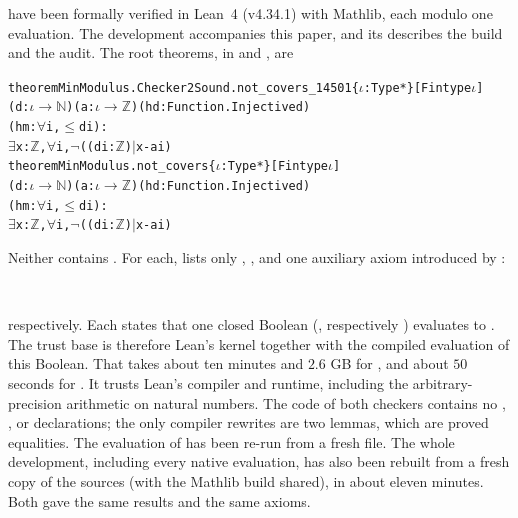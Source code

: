  have been formally verified in Lean~4 (v4.34.1) with Mathlib, each modulo one
 evaluation. The development accompanies this paper, and its  describes the build and the audit. The root
theorems, in  and , are
\begin{alltt}\small
theorem MinModulus.Checker2Sound.not_covers_14501 \{\(\iota\) : Type*\} [Fintype \(\iota\)]
    (d : \(\iota\) \(\to\) \(\mathbb{N}\)) (a : \(\iota\) \(\to\) \(\mathbb{Z}\)) (hd : Function.Injective d)
    (hm : \(\forall\) i, \MzeroNum \(\le\) d i) :
    \(\exists\) x : \(\mathbb{Z}\), \(\forall\) i, \(\neg\) ((d i : \(\mathbb{Z}\)) \(\mid\) x - a i)
theorem MinModulus.not_covers \{\(\iota\) : Type*\} [Fintype \(\iota\)]
    (d : \(\iota\) \(\to\) \(\mathbb{N}\)) (a : \(\iota\) \(\to\) \(\mathbb{Z}\)) (hd : Function.Injective d)
    (hm : \(\forall\) i, \MzeroLeanNum \(\le\) d i) :
    \(\exists\) x : \(\mathbb{Z}\), \(\forall\) i, \(\neg\) ((d i : \(\mathbb{Z}\)) \(\mid\) x - a i)
\end{alltt}
Neither contains . For each,  lists only , ,
 and one auxiliary axiom introduced by :
\begin{center}\small{}\\
\end{center}
respectively. Each states that one closed Boolean (, respectively ) evaluates to
. The trust base is therefore Lean's kernel together with the compiled evaluation of this Boolean. That
takes about ten minutes and $2.6$ GB for , and about $50$ seconds for . It trusts
Lean's compiler and runtime, including the arbitrary-precision arithmetic on natural numbers. The code of both
checkers contains no , ,  or  declarations; the only
compiler rewrites are two  lemmas, which are proved equalities. The evaluation of  has been
re-run from a fresh file. The whole development, including every native evaluation, has also been rebuilt from a fresh
copy of the sources (with the Mathlib build shared), in about eleven minutes. Both gave the same results and the
same axioms.

